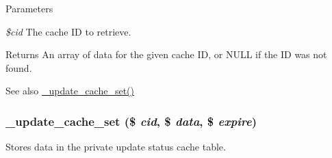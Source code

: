 \begin{DoxyParams}{Parameters}
\item[{\em \$cid}]The cache ID to retrieve.\end{DoxyParams}
\begin{DoxyReturn}{Returns}
An array of data for the given cache ID, or NULL if the ID was not found.
\end{DoxyReturn}
\begin{DoxySeeAlso}{See also}
\hyperlink{group__update__status__cache_ga3610ff1515f81f28c69b019e5482b77b}{\_\-update\_\-cache\_\-set()} 
\end{DoxySeeAlso}
\hypertarget{group__update__status__cache_ga3610ff1515f81f28c69b019e5482b77b}{
\subsubsection[{\_\-update\_\-cache\_\-set}]{\setlength{\rightskip}{0pt plus 5cm}\_\-update\_\-cache\_\-set (\$ {\em cid}, \/  \$ {\em data}, \/  \$ {\em expire})}}
\label{group__update__status__cache_ga3610ff1515f81f28c69b019e5482b77b}
Stores data in the private update status cache table.


